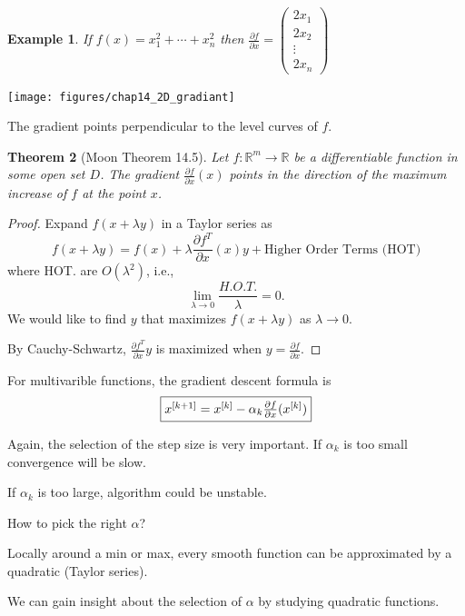 \documentclass{article}
\newtheorem{theorem}{Theorem}[section]
\newtheorem{example}[theorem]{Example}
\begin{document}
	\begin{example}
		If $f(x) = x_1^2 + \cdots + x_n^2$ then
		\( 
			\frac{\partial  f}{\partial  x} 
				= \begin{pmatrix}
		    		2x_1\\
		    		2x_2\\
		    		\vdots\\
		    		2x_n
		  		  \end{pmatrix}
		\)		
	\end{example}

	\begin{center}
		\texttt{[image: figures/chap14\_2D\_gradiant]}
	\end{center}
	The gradient points perpendicular to the level curves of $f$.	

	\begin{theorem}[Moon Theorem 14.5]
		Let $f:\mathbb{R}^m \to \mathbb{R}$ be a differentiable function in some open set $D$.  The gradient $\frac{\partial  f}{\partial  x}(x)$ points in the direction of the maximum increase of $f$ at the point $x$.		
	\end{theorem}

	\begin{proof}
		Expand $f(x+\lambda y)$ in a Taylor series as
		\[ 
			f(x + \lambda y) = f(x) + \lambda\frac{\partial  f^T}{\partial  x}(x)y + \text{Higher Order Terms (HOT)} 
		\]
		where HOT. are $O(\lambda^2)$, i.e.,
		\[
			\lim_{\lambda \to 0}\frac{H.O.T.}{\lambda} = 0.
		\]	
		We would like to find $y$ that maximizes $f(x + \lambda y)$ as $\lambda \to 0$.

		By Cauchy-Schwartz, $\frac{\partial  f^T}{\partial  x}y$ is maximized when $y = \frac{\partial  f}{\partial  x}$.	
	\end{proof}

	For multivarible functions, the gradient descent formula is
	\[ 
		\fbox{$x^{[k+1]} = x^{[k]} - \alpha_k \frac{\partial f}{\partial x}(x^{[k]})$}
	\]
	
	Again, the selection of the step size is very important.  If $\alpha_k$ is too small convergence will be slow.
	
	
	If $\alpha_k$ is too large, algorithm could be unstable.	
	
	
	How to pick the right $\alpha$?
	
	Locally around a min or max, every smooth function can be approximated by a quadratic (Taylor series).  
	
	
	We can gain insight about the selection of $\alpha$ by studying quadratic functions.
	
\end{document}
